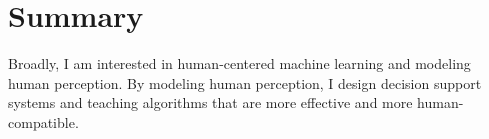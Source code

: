 
\section{Summary}




Broadly, I am interested in human-centered machine learning and modeling human perception. By modeling human perception, I design decision support systems and teaching algorithms that are more effective and more human-compatible.



